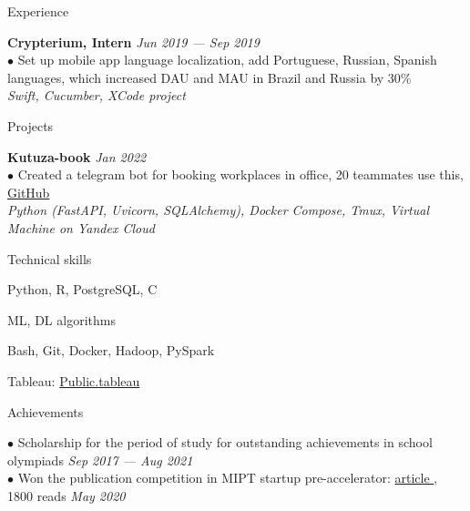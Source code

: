 \documentclass{resume} %
\begin{document}
\begin{rSection}{ Experience }
        
    { \bf Crypterium, Intern} \hfill {\em Jun 2019 — Sep 2019}\\
    { $\bullet$ Set up mobile app language localization, add Portuguese, Russian, Spanish languages, which increased DAU and MAU in Brazil and Russia by 30\%}\\
    { \it Swift, Cucumber, XCode project }

\end{rSection}

\begin{rSection}{ Projects }

    { \bf Kutuza-book} \hfill {\em Jan 2022}\\
    { $\bullet$ Created a telegram bot for booking workplaces in office, 20 teammates use this, \href{https://github.com/YHx07/Kutuza-book}{GitHub}}\\
    { \it Python (FastAPI, Uvicorn, SQLAlchemy), Docker Compose, Tmux, Virtual Machine on Yandex Cloud }
    
\end{rSection}
    


\begin{rSection}{ Technical skills }
    
    \noindent
    \begin{multicols}{2}[]
    
    Python, R, PostgreSQL, C
    
    ML, DL algorithms 
    
    Bash, Git, Docker, Hadoop, PySpark
   
    Tableau: \href{https://public.tableau.com/profile/dmitriy5983#!/}{Public.tableau}
    
    \end{multicols}

\end{rSection}

\begin{rSection}{ Achievements }

    { $\bullet$ Scholarship for the period of study for outstanding achievements in school olympiads } \hfill {\em Sep 2017 — Aug 2021}\\
    { $\bullet$ Won the publication competition in MIPT startup pre-accelerator: \href{https://vc.ru/tribuna/125433-kak-my-hoteli-pomoch-taksistam-no-pandemiya-vse-isportila}{ article }, 1800 reads }\hfill {\em May 2020}

\end{rSection}
\end{document}
